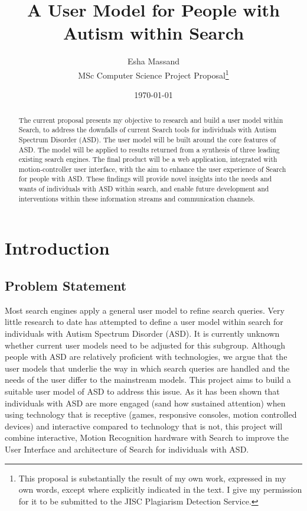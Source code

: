 \documentclass[10pt]{article}
\begin{document}
\title{A User Model for People with Autism within Search }
\author{Esha Massand\\
MSc Computer Science Project Proposal\footnote{This proposal is substantially the result of my own work, expressed in my own words, except where explicitly indicated in the text. I give my permission for it to be submitted to the JISC Plagiarism Detection Service. }}
\date{\today}
\maketitle

\begin{abstract}
The current proposal presents my objective to research and build a user model within Search, to address the downfalls of current Search tools for individuals with Autism Spectrum Disorder (ASD). The user model will be built around the core features of ASD. The model will be applied to results returned from a synthesis of three leading existing search engines. The final product will be a web application, integrated with motion-controller user interface, with the aim to enhance the user experience of Search for people with ASD. These findings will provide novel insights into the needs and wants of individuals with ASD within search, and enable future development and interventions within these information streams and communication channels.
\end{abstract}

\tableofcontents

\section{Introduction}
\subsection{Problem Statement} \label{prob}
Most search engines apply a general user model to refine search queries. Very little research to date has attempted to define a user model within search for individuals with Autism Spectrum Disorder (ASD). It is currently unknown whether current user models need to be adjusted for this subgroup. Although people with ASD are relatively proficient with technologies, we argue that the user models that underlie the way in which search queries are handled and the needs of the user differ to the mainstream models. This project aims to build a suitable user model of ASD to address this issue.
As it has been shown that individuals with ASD are more engaged (sand how sustained attention) when using technology that is receptive (games, responsive consoles, motion controlled devices) and interactive compared to technology that is not, this project will combine interactive, Motion Recognition hardware with Search to improve the User Interface and architecture of Search for individuals with ASD.
\end{document}
